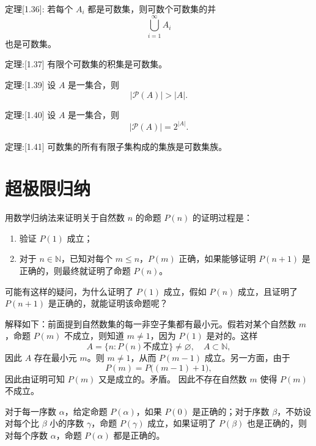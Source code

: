 \begin{theorem}
定理[1.36]:
若每个 $A_i$ 都是可数集，则可数个可数集的并
\[
\bigcup_{i=1}^{\infty} A_i
\]
也是可数集。
\end{theorem}
\begin{theorem}定理:[1.37]
有限个可数集的积集是可数集。
\end{theorem}
\begin{theorem}[A的幂集的势大于A的势]定理:[1.39]
设 $A$ 是一集合，则
\[
|\mathcal{P}(A)| > |A|.
\]
\end{theorem}
\begin{theorem}[幂集的势和原集的势的关系]定理:[1.40]
设 $A$ 是一集合，则
\[
|\mathcal{P}(A)| = 2^{|A|}.
\]
\end{theorem}
\begin{theorem}定理:[1.41]
可数集的所有有限子集构成的集族是可数集族。
\end{theorem}
\section{超极限归纳}
用数学归纳法来证明关于自然数 $n$ 的命题 $P(n)$ 的证明过程是：

\begin{enumerate}
  \item 验证 $P(1)$ 成立；
  \item 对于 $n \in \mathbb{N}$，已知对每个 $m \leq n$，$P(m)$ 正确，如果能够证明 $P(n+1)$ 是正确的，则最终就证明了命题 $P(n)$。
\end{enumerate}

可能有这样的疑问，为什么证明了 $P(1)$ 成立，假如 $P(n)$ 成立，且证明了 $P(n+1)$ 是正确的，就能证明该命题呢？

解释如下：前面提到自然数集的每一非空子集都有最小元。假若对某个自然数 $m$，命题 $P(m)$ 不成立，则知道 $m \neq 1$，因为 $P(1)$ 是对的。这样
\[
A = \{ n : P(n) \text{不成立} \} \neq \varnothing, \quad A \subset \mathbb{N},
\]
因此 $A$ 存在最小元 $m$。则 $m \neq 1$，从而 $P(m-1)$ 成立。另一方面，由于
\[
P(m) = P\big( (m-1)+1 \big),
\]
因此由证明可知 $P(m)$ 又是成立的。矛盾。  
因此不存在自然数 $m$ 使得 $P(m)$ 不成立。
\begin{definition}[超极限归纳]
    

对于每一序数 $\alpha$，给定命题 $P(\alpha)$，如果 $P(0)$ 是正确的；对于序数 $\beta$，不妨设对每个比 $\beta$ 小的序数 $\gamma$，命题 $P(\gamma)$ 成立，如果证明了 $P(\beta)$ 也是正确的，则对每个序数 $\alpha$，命题 $P(\alpha)$ 都是正确的。
\end{definition}


